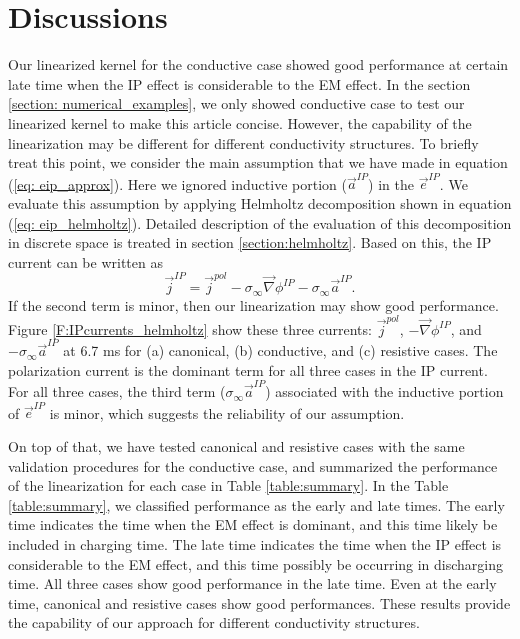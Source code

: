 \documentclass[a4paper, 11pt]{article}
\newcommand{\grad}{\vec \nabla}
\newcommand{\siginf}{\sigma_\infty}
\renewcommand {\j}  { {\vec j} }
\newcommand {\e}  { {\vec e} }
\begin{document}

\section{Discussions}
Our linearized kernel for the conductive case showed good performance at certain late time when the IP effect is considerable to the EM effect. 
In the section \ref{section: numerical_examples}, we only showed conductive case to test our linearized kernel to make this article concise. 
However, the capability of the linearization may be different for different conductivity structures. 
To briefly treat this point, we consider the main assumption that we have made in equation (\ref{eq: eip_approx}). 
Here we ignored inductive portion ($\vec{a}^{IP}$) in the $\e^{IP}$. 
We evaluate this assumption by applying Helmholtz decomposition shown in equation (\ref{eq: eip_helmholtz}). 
Detailed description of the evaluation of this decomposition in discrete space is treated in section \ref{section:helmholtz}. 
Based on this, the IP current can be written as
\begin{equation}
  \j^{IP} = \j^{pol}-\siginf \grad \phi^{IP}-\siginf \vec{a}^{IP}.
\end{equation}
If the second term is minor, then our linearization may show good performance. 
Figure \ref{F:IPcurrents_helmholtz} show these three currents: $\j^{pol}$, $-\grad\phi^{IP}$, and $-\siginf\vec{a}^{IP}$ at 6.7 ms for (a) canonical, (b) conductive, and (c) resistive cases. 
The polarization current is the dominant term for all three cases in the IP current. 
For all three cases, the third term ($\siginf\vec{a}^{IP}$) associated with the inductive portion of $\e^{IP}$ is minor, which suggests the reliability of our assumption. 

On top of that, we have tested canonical and resistive cases with the same validation procedures for the conductive case, and summarized the performance of the linearization for each case in Table \ref{table:summary}. 
In the Table \ref{table:summary}, we classified performance as the early and late times. 
The early time indicates the time when the EM effect is dominant, and this time likely be included in charging time. 
The late time indicates the time when the IP effect is considerable to the EM effect, and this time possibly be occurring in discharging time.
All three cases show good performance in the late time.
Even at the early time, canonical and resistive cases show good performances. 
These results provide the capability of our approach for different conductivity structures. 
\end{document}
